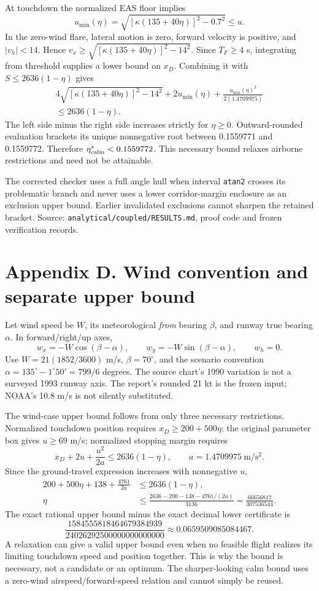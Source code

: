 At touchdown the normalized EAS floor implies
\[
u_{\min}(\eta)=\sqrt{[\kappa(135+40\eta)]^2-0.7^2}\leq u.
\]
In the zero-wind flare, lateral motion is zero, forward velocity is positive, and $|v_h|<14$. Hence $v_x\geq\sqrt{[\kappa(135+40\eta)]^2-14^2}$. Since $T_F\geq4$ s, integrating from threshold supplies a lower bound on $x_D$. Combining it with $S\leq2636(1-\eta)$ gives
\begin{multline}
4\sqrt{[\kappa(135+40\eta)]^2-14^2}+2u_{\min}(\eta)
+\frac{u_{\min}(\eta)^2}{2(1.4709975)}\\
\leq2636(1-\eta).
\end{multline}
The left side minus the right side increases strictly for $\eta\geq0$. Outward-rounded evaluation brackets its unique nonnegative root between 0.1559771 and 0.1559772. Therefore $\eta^*_{\rm calm}<0.1559772$. This necessary bound relaxes airborne restrictions and need not be attainable.

The corrected checker uses a full angle hull when interval \texttt{atan2} crosses its problematic branch and never uses a lower corridor-margin enclosure as an exclusion upper bound. Earlier invalidated exclusions cannot sharpen the retained bracket. Source: \texttt{analytical/coupled/RESULTS.md}, proof code and frozen verification records.
\clearpage
\section{Appendix D. Wind convention and separate upper bound}\label{app:windbound}
Let wind speed be $W$, its meteorological \emph{from} bearing $\beta$, and runway true bearing $\alpha$. In forward/right/up axes,
\[
w_x=-W\cos(\beta-\alpha),\qquad w_y=-W\sin(\beta-\alpha),\qquad w_h=0.
\]
Use $W=21(1852/3600)$ m/s, $\beta=70^\circ$, and the scenario convention $\alpha=135^\circ-1^\circ50'=799/6$ degrees. The source chart's 1990 variation is not a surveyed 1993 runway axis. The report's rounded 21 kt is the frozen input; NOAA's 10.8 m/s is not silently substituted.

The wind-case upper bound follows from only three necessary restrictions. Normalized touchdown position requires $x_D\geq200+500\eta$; the original parameter box gives $u\geq69$ m/s; normalized stopping margin requires
\[
x_D+2u+\frac{u^2}{2a}\leq2636(1-\eta),\qquad a=1.4709975\ \mathrm{m/s^2}.
\]
Since the ground-travel expression increases with nonnegative $u$,
\begin{align}
200+500\eta+138+\frac{4761}{2a}&\leq2636(1-\eta),\\
\eta&\leq\frac{2636-200-138-4761/(2a)}{3136}
=\frac{66656817}{307536544}.
\end{align}
The exact rational upper bound minus the exact decimal lower certificate is
\[
\frac{1584555818464679384939}{24026292500000000000000}
\approx0.0659509085084467.
\]
A relaxation can give a valid upper bound even when no feasible flight realizes its limiting touchdown speed and position together. This is why the bound is necessary, not a candidate or an optimum. The sharper-looking calm bound uses a zero-wind airspeed/forward-speed relation and cannot simply be reused.

